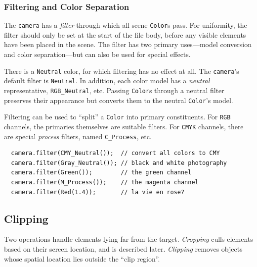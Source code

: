 \documentclass[12pt,letterpaper]{book}
\newcommand{\code}[1]{\texttt{#1}}
\begin{document}
\subsubsection*{Filtering and Color Separation}

The \code{camera} has a \emph{filter} through which all scene
\code{Color}s pass. For uniformity, the filter should only be set at
the start of the file body, before any visible elements have been
placed in the scene.  The filter has two primary uses---model
conversion and color separation---but can also be used for special
effects.

There is a \code{Neutral} color, for which filtering has no effect at
all. The \code{camera}'s default filter is \code{Neutral}. In
addition, each color model has a \emph{neutral} representative,
\code{RGB\_Neutral}, etc. Passing \code{Color}s through a neutral
filter preserves their appearance but converts them to the neutral
\code{Color}'s model.

Filtering can be used to ``split'' a \code{Color} into primary
constituents. For \code{RGB} channels, the primaries themselves are
suitable filters. For \code{CMYK} channels, there are special
\emph{process} filters, named \verb+C_Process+, etc.
\begin{verbatim}
  camera.filter(CMY_Neutral());  // convert all colors to CMY
  camera.filter(Gray_Neutral()); // black and white photography
  camera.filter(Green());        // the green channel
  camera.filter(M_Process());    // the magenta channel
  camera.filter(Red(1.4));       // la vie en rose?
\end{verbatim}


\subsection{Clipping}

%
Two operations handle elements lying far from the target.
\emph{Cropping} culls elements based on their screen location, and is
described later. \emph{Clipping} removes objects whose spatial
location lies outside the ``clip region''.
\end{document}
